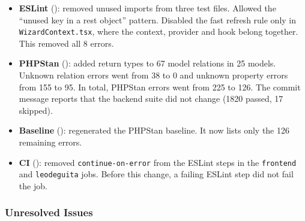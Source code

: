 \begin{itemize}[nosep]
  \item \textbf{ESLint} (): removed unused imports from three test files.
        Allowed the ``unused key in a rest object'' pattern.
        Disabled the fast refresh rule only in \texttt{WizardContext.tsx}, where the context, provider and hook belong together.
        This removed all 8 errors.
  \item \textbf{PHPStan} (): added return types to 67 model relations in 25 models.
        Unknown relation errors went from 38 to 0 and unknown property errors from 155 to 95.
        In total, PHPStan errors went from 225 to 126.
        The commit message reports that the backend suite did not change (1820 passed, 17 skipped).
  \item \textbf{Baseline} (): regenerated the PHPStan baseline. It now lists only the 126 remaining errors.
  \item \textbf{CI} (): removed \texttt{continue-on-error} from the ESLint steps in the \texttt{frontend} and \texttt{leodeguita} jobs.
        Before this change, a failing ESLint step did not fail the job.
\end{itemize}

\subsubsection*{Unresolved Issues}

